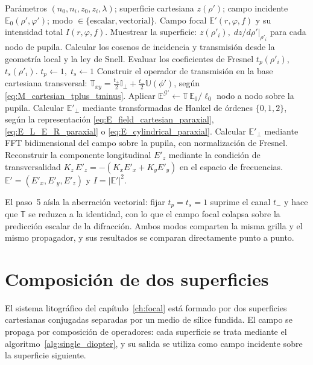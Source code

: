 \begin{algorithm}[H]
\caption{Campo focal tras un dioptrio estigmático}
\label{alg:single_diopter}
\begin{algorithmic}[1]
\Require Parámetros $(n_0,n_i,z_0,z_i,\lambda)$; superficie cartesiana
$z(\rho')$; campo incidente $\mathbb E_0(\rho',\varphi')$; modo
$\in\{\text{escalar},\text{vectorial}\}$.
\Ensure Campo focal $\mathbb E'(r,\varphi,f)$ y su intensidad total
$I(r,\varphi,f)$.
\State Muestrear la superficie: $z(\rho'_i),\;dz/d\rho'|_{\rho'_i}$
para cada nodo de pupila.
\State Calcular los cosenos de incidencia y transmisión desde la geometría
local y la ley de Snell.
\State Evaluar los coeficientes de Fresnel $t_p(\rho'_i)$, $t_s(\rho'_i)$.
  \State $t_p\gets 1,\;t_s\gets 1$ 
\EndIf
\State Construir el operador de transmisión en la base cartesiana
transversal:
$\mathbb T_{xy}=\tfrac{t_+}{2}\mathbb I_\perp+\tfrac{t_-}{2}\mathbb U(\phi')$,
según \eqref{eq:M_cartesian_tplus_tminus}.
\State Aplicar $\mathbb E^{\mathscr G'}\gets\mathbb T\,\mathbb E_0/\ell_0$ nodo a
nodo sobre la pupila.
  \State Calcular $\mathbb E'_\perp$ mediante transformadas de Hankel de
  órdenes $\{0,1,2\}$, según la representación
  \eqref{eq:E_field_cartesian_paraxial}, \eqref{eq:E_L_E_R_paraxial} o
  \eqref{eq:E_cylindrical_paraxial}.
\Else
  \State Calcular $\mathbb E'_\perp$ mediante FFT bidimensional del campo
  sobre la pupila, con normalización de Fresnel.
\EndIf
\State Reconstruir la componente longitudinal $E'_z$ mediante la condición
de transversalidad
$K_z\,E'_z=-(K_x E'_x+K_y E'_y)$ en el espacio de frecuencias.
\State \Return $\mathbb E'=(E'_x,E'_y,E'_z)$ y $I=|\mathbb E'|^2$.
\end{algorithmic}
\end{algorithm}

El paso~5 aísla la aberración vectorial: fijar $t_p=t_s=1$ suprime el
canal $t_-$ y hace que $\mathbb T$ se reduzca a la identidad, con lo que el
campo focal colapsa sobre la predicción escalar de la difracción. Ambos
modos comparten la misma grilla y el mismo propagador, y sus resultados se
comparan directamente punto a punto.

\section{Composición de dos superficies}

El sistema litográfico del capítulo~\ref{ch:focal} está formado por dos
superficies cartesianas conjugadas separadas por un medio de sílice
fundida. El campo se propaga por composición de operadores: cada superficie
se trata mediante el algoritmo~\ref{alg:single_diopter}, y su salida se
utiliza como campo incidente sobre la superficie siguiente.

